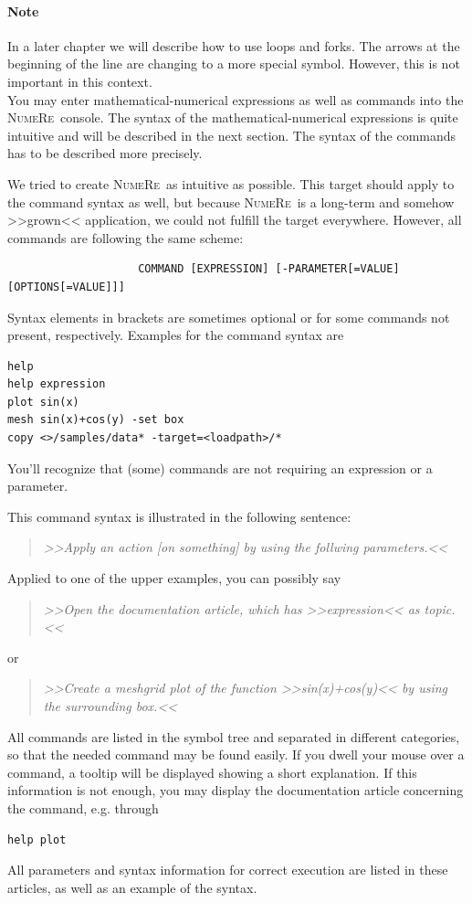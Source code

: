 \documentclass[DIV=14,headsepline,footsepline]{scrbook}
\newcommand{\NR}{\textsc{Nu\-me\-Re}}
\begin{document}
				\paragraph{Note}
					In a later chapter we will describe how to use loops and forks. The arrows at the beginning of the line are changing to a more special symbol. However, this is not important in this context.
				\bigskip\\
				You may enter mathematical-numerical expressions as well as commands into the \NR\ console. The syntax of the mathematical-numerical expressions is quite intuitive and will be described in the next section. The syntax of the commands has to be described more precisely.
				
				We tried to create \NR\ as intuitive as possible. This target should apply to the command syntax as well, but because \NR\ is a long-term and somehow >>grown<< application, we could not fulfill the target everywhere. However, all commands are following the same scheme:
				\begin{verbatim}
					COMMAND [EXPRESSION] [-PARAMETER[=VALUE] [OPTIONS[=VALUE]]]
				\end{verbatim}
				Syntax elements in brackets are sometimes optional or for some commands not present, respectively. Examples for the command syntax are
				\begin{lstlisting}
help
help expression
plot sin(x)
mesh sin(x)+cos(y) -set box
copy <>/samples/data* -target=<loadpath>/*
				\end{lstlisting}
				You'll recognize that (some) commands are not requiring an expression or a parameter.
				
				This command syntax is illustrated in the following sentence:
				\begin{quotation}
					\noindent\emph{>>Apply an action [on something] by using the follwing parameters.<<}
				\end{quotation}
				Applied to one of the upper examples, you can possibly say
				\begin{quotation}
					\noindent\emph{>>Open the documentation article, which has >>expression<< as topic.<<}
				\end{quotation}
				or
				\begin{quotation}
					\noindent\emph{>>Create a meshgrid plot of the function >>sin(x)+cos(y)<< by using the surrounding box.<<}
				\end{quotation}
				
				All commands are listed in the symbol tree and separated in different categories, so that the needed command may be found easily. If you dwell your mouse over a command, a tooltip will be displayed showing a short explanation. If this information is not enough, you may display the documentation article concerning the command, e.g. through
				\begin{lstlisting}
help plot
				\end{lstlisting}
				All parameters and syntax information for correct execution are listed in these articles, as well as an example of the syntax.
				
\end{document}
